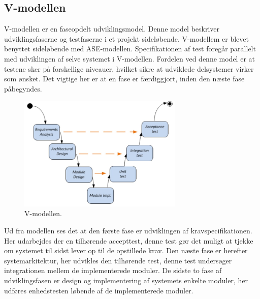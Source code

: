 \subsection{V-modellen}
V-modellen er en faseopdelt udviklingsmodel. Denne model beskriver udviklingsfaserne og testfaserne i et projekt sideløbende. V-modellem er blevet benyttet sideløbende med ASE-modellen. Specifikationen af test foregår parallelt med udviklingen af selve systemet i V-modellen. Fordelen ved denne model er at testene sker på forskellige niveauer, hvilket sikre at udviklede delsystemer virker som ønsket. Det vigtige her er at en fase er færdiggjort, inden den næste fase påbegyndes. 
\begin{figure}[H]
\includegraphics[width =0.7\textwidth , center]{billeder/Vmodel}
\caption{V-modellen.}
\end{figure} 
Ud fra modellen ses det at den første fase er udviklingen af kravspecifikationen. Her udarbejdes der en tilhørende accepttest, denne test gør det muligt at tjekke om systemet til sidst lever op til de opstillede krav. Den næste fase er herefter systemarkitektur, her udvikles den tilhørende test, denne test undersøger integrationen mellem de implementerede moduler. De sidste to fase af udviklingsfasen er design og implementering af systemets enkelte moduler, her udføres enhedstesten løbende af de implementerede moduler.
